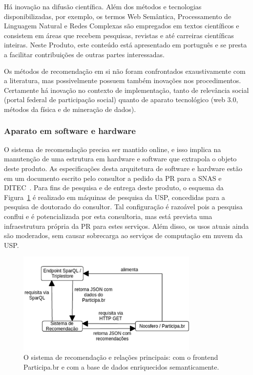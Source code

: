 \documentclass[12pt]{article}
\begin{document}
Há inovação na difusão científica. Além dos métodos e tecnologias disponibilizadas, por exemplo, os termos Web Semântica, Processamento de Linguagem Natural e Redes Complexas são empregados em textos científicos e consistem em áreas que recebem pesquisas, revistas e até carreiras científicas inteiras. Neste Produto, este conteúdo está apresentado em português e se presta a facilitar contribuições de outras partes interessadas.

Os métodos de recomendação em si não foram confrontados exaustivamente com a literatura, mas possivelmente possuem também inovações nos procedimentos. Certamente há inovação no contexto de implementação, tanto de relevância social (portal federal de participação social) quanto de aparato tecnológico (web 3.0, métodos da física e de mineração de dados).

\subsubsection{Aparato em software e hardware}\label{subsec:hs}


O sistema de recomendação precisa ser mantido online, e isso implica na manutenção de uma estrutura em hardware e software que extrapola o objeto deste produto. As especificações desta arquitetura de software e hardware estão em um documento escrito pelo consultor a pedido da PR para a SNAS e DITEC~\cite{smDITEC}. Para fins de pesquisa e de entrega deste produto, o esquema da Figura~\ref{fig:sr} é realizado em máquinas de pesquisa da USP, concedidas para a pesquisa de doutorado do consultor. Tal configuração é razoável pois a pesquisa conflui e é potencializada por esta consultoria, mas está prevista uma infraestrutura própria da PR para estes serviços. Além disso, os usos atuais ainda são moderados, sem causar sobrecarga ao serviços de computação em nuvem da USP.

\begin{figure}[h!]
  \centering
      \includegraphics[width=0.8\textwidth]{sr}
  \caption{O sistema de recomendação e relações principais: com o frontend Participa.br e com a base de dados enriquecidos semanticamente.}\label{fig:sr}
\end{figure}
\end{document}
